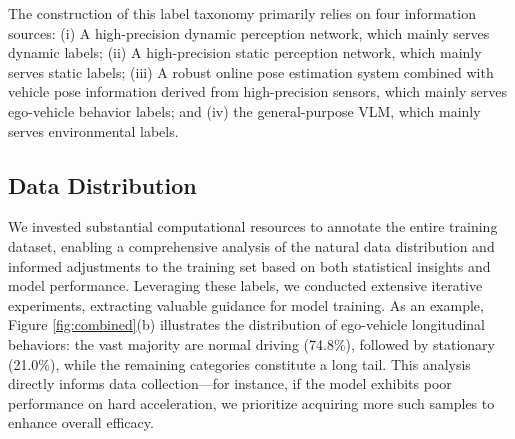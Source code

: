 The construction of this label taxonomy primarily relies on four information sources: (i) A high-precision dynamic perception network, which mainly serves dynamic labels; (ii) A high-precision static perception network, which mainly serves static labels; (iii) A robust online pose estimation system combined with vehicle pose information derived from high-precision sensors, which mainly serves ego-vehicle behavior labels; and (iv) the general-purpose VLM, which mainly serves environmental labels.

\subsection{Data Distribution}
We invested substantial computational resources to annotate the entire training dataset, enabling a comprehensive analysis of the natural data distribution and informed adjustments to the training set based on both statistical insights and model performance. Leveraging these labels, we conducted extensive iterative experiments, extracting valuable guidance for model training. As an example, Figure \ref{fig:combined}(b) illustrates the distribution of ego-vehicle longitudinal behaviors: the vast majority are normal driving (74.8\%), followed by stationary (21.0\%), while the remaining categories constitute a long tail. This analysis directly informs data collection—for instance, if the model exhibits poor performance on hard acceleration, we prioritize acquiring more such samples to enhance overall efficacy.

